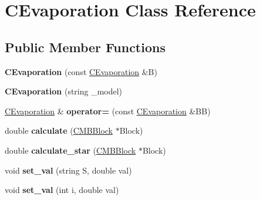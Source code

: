 \hypertarget{class_c_evaporation}{}\section{C\+Evaporation Class Reference}
\label{class_c_evaporation}
\subsection*{Public Member Functions}
\begin{DoxyCompactItemize}
\item 
\mbox{\label{class_c_evaporation_a2356750a9d416e49337378fa4dac4069}} 
{\bfseries C\+Evaporation} (const \hyperlink{class_c_evaporation}{C\+Evaporation} \&B)
\item 
\mbox{\label{class_c_evaporation_aa6aba42e1cadf1b76ccde6fc39224531}} 
{\bfseries C\+Evaporation} (string \+\_\+model)
\item 
\mbox{\label{class_c_evaporation_aaea006d9bb070127a8ceae92a15fb8d2}} 
\hyperlink{class_c_evaporation}{C\+Evaporation} \& {\bfseries operator=} (const \hyperlink{class_c_evaporation}{C\+Evaporation} \&BB)
\item 
\mbox{\label{class_c_evaporation_a3670b12e224f2e6d01013cc629d9bb58}} 
double {\bfseries calculate} (\hyperlink{class_c_m_b_block}{C\+M\+B\+Block} $\ast$Block)
\item 
\mbox{\label{class_c_evaporation_aff07b71bf6ddc38be4e18e570e724150}} 
double {\bfseries calculate\+\_\+star} (\hyperlink{class_c_m_b_block}{C\+M\+B\+Block} $\ast$Block)
\item 
\mbox{\label{class_c_evaporation_a97a7c7f5413526df8ae091240dccb8f7}} 
void {\bfseries set\+\_\+val} (string S, double val)
\item 
\mbox{\label{class_c_evaporation_ab14d501092b725f15eedb47172e1e19a}} 
void {\bfseries set\+\_\+val} (int i, double val)
\end{DoxyCompactItemize}
